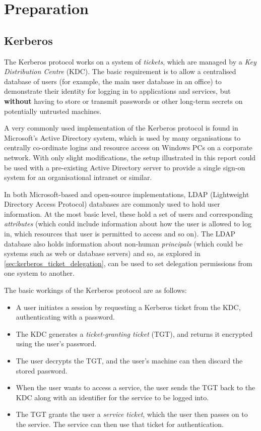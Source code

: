 \documentclass[12pt]{report}
\begin{document}
\chapter{Preparation}

\section{Kerberos}
The Kerberos protocol works on a system of \textit{tickets}, which are managed by a \textit{Key Distribution Centre} (KDC). The basic requirement is to allow a centralised database of users (for example, the main user database in an office) to demonstrate their identity for logging in to applications and services, but \textbf{without} having to store or transmit passwords or other long-term secrets on potentially untrusted machines.

A very commonly used implementation of the Kerberos protocol is found in Microsoft's Active Directory system, which is used by many organisations to centrally co-ordinate logins and resource access on Windows PCs on a corporate network. With only slight modifications, the setup illustrated in this report could be used with a pre-existing Active Directory server to provide a single sign-on system for an organisational intranet or similar.

In both Microsoft-based and open-source implementations, LDAP (Lightweight Directory Access Protocol) databases are commonly used to hold user information. At the most basic level, these hold a set of users and corresponding \textit{attributes} (which could include information about how the user is allowed to log in, which resources that user is permitted to access and so on). The LDAP database also holds information about non-human \textit{principals} (which could be systems such as web or database servers) and so, as explored in \autoref{sec:kerberos_ticket_delegation}, can be used to set delegation permissions from one system to another.

The basic workings of the Kerberos protocol are as follows:

\begin{itemize}
\item
  A user initiates a session by requesting a Kerberos ticket from the KDC, authenticating with a password.
\item
  The KDC generates a \textit{ticket-granting ticket} (TGT), and returns it encrypted using the user's password.
\item
  The user decrypts the TGT, and the user's machine can then discard the stored password.
\item
  When the user wants to access a service, the user sends the TGT back to the KDC along with an identifier for the service to be logged into.
\item
  The TGT grants the user a \textit{service ticket}, which the user then passes on to the service. The service can then use that ticket for authentication.
\end{itemize}
\end{document}
